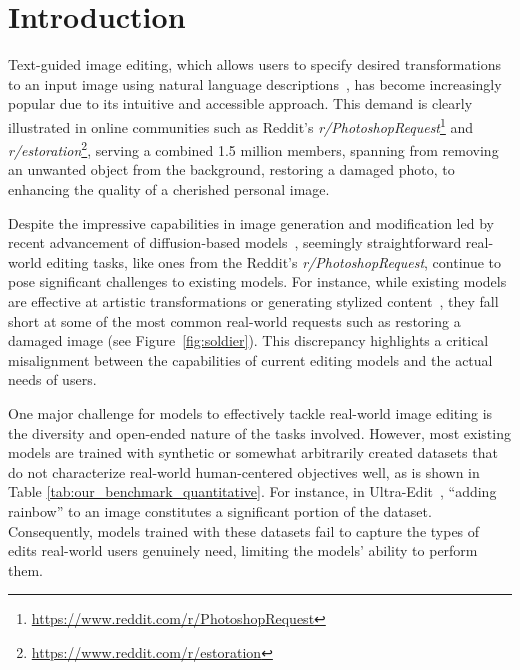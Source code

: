 \section{Introduction}
Text-guided image editing, which allows users to specify desired transformations to an input image using natural language descriptions~\cite{brooks2023instructpix2pix, zhang2024magicbrush}, has become increasingly popular due to its intuitive and accessible approach.
This demand is clearly illustrated in online communities such as Reddit’s \textit{r/PhotoshopRequest}\footnote{\url{https://www.reddit.com/r/PhotoshopRequest}} and \textit{r/estoration}\footnote{\url{https://www.reddit.com/r/estoration}}, serving a combined 1.5 million members, spanning from removing an unwanted object from the background, restoring a damaged photo, to enhancing the quality of a cherished personal image.

Despite the impressive capabilities in image generation and modification led by recent advancement of diffusion-based models~\cite{Ramesh2022DALLE2, rombach2022high, brooks2023instructpix2pix, zhang2024magicbrush}, seemingly straightforward real-world editing tasks, like ones from the Reddit's \textit{r/PhotoshopRequest}, continue to pose significant challenges to existing models.
For instance, while existing models are effective at artistic transformations or generating stylized content~\cite{brooks2023instructpix2pix, zhang2024magicbrush, mokady2023null, krojer2024learning, meng2021sdedit, zhang2024hive, sheynin2024emu}, they fall short at some of the most common real-world requests such as restoring a damaged image (see Figure~\ref{fig:soldier}). This discrepancy highlights a critical misalignment between the capabilities of current editing models and the actual needs of users.

One major challenge for models to effectively tackle real-world image editing is the diversity and open-ended nature of the tasks involved. However, most existing models are trained with synthetic or somewhat arbitrarily created datasets that do not characterize real-world human-centered objectives well, as is shown in Table \ref{tab:our_benchmark_quantitative}.
For instance, in Ultra-Edit~\cite{zhao2024ultraedit}, ``adding rainbow'' to an image constitutes a significant portion of the dataset.
Consequently, models trained with these datasets fail to capture the types of edits real-world users genuinely need, limiting the models' ability to perform them.

